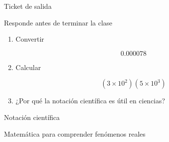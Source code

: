 \documentclass[aspectratio=169,10pt,handout]{beamer}
\begin{document}
	\begin{frame}{Ticket de salida}
		
		\begin{block}{Responde antes de terminar la clase}
			
			\begin{enumerate}
				
				\item Convertir
				
				\[
				0.000078
				\]
				
				\item Calcular
				
				\[
				(3\times10^2)(5\times10^3)
				\]
				
				\item ¿Por qué la notación científica es útil en ciencias?
				
			\end{enumerate}
			
		\end{block}
		
	\end{frame}
	
	\begin{frame}
		
		\centering
		
		{\Huge\color{USTTeal}\faSeedling}
		
		\vspace{0.3cm}
		
		{\Large Notación científica}
		
		\vspace{0.3cm}
		
		{\small Matemática para comprender fenómenos reales}
		
	\end{frame}
	
\end{document}
